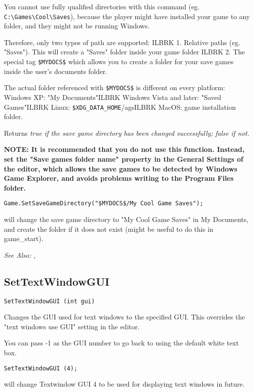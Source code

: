 You cannot use fully qualified directories with this command (eg. \verb$C:\Games\Cool\Saves$), because
the player might have installed your game to any folder, and they might not be running Windows.

Therefore, only two types of path are supported: ILBRK
1. Relative paths (eg. "Saves"). This will create a "Saves" folder inside your game folder ILBRK
2. The special tag \verb!$MYDOCS$! which allows you to create a folder for your save games
inside the user's documents folder.

The actual folder referenced with \verb!$MYDOCS$! is different on every platform:
Windows XP: "My Documents"ILBRK
Windows Vista and later: "Saved Games"ILBRK
Linux: \verb!$XDG_DATA_HOME!/agsILBRK
MacOS: game installation folder.

Returns \it{true} if the save game directory has been changed successfully; \it{false} if not.

\bf{NOTE:} It is recommended that you do not use this function. Instead, set the "Save games
folder name" property in the General Settings of the editor, which allows the save games to be
detected by Windows Game Explorer, and avoids problems writing to the Program Files folder.

\begin{verbatim}
Game.SetSaveGameDirectory("$MYDOCS$/My Cool Game Saves");
\end{verbatim}
will change the save game directory to "My Cool Game Saves" in My Documents, and create the
folder if it does not exist (might be useful to do this in game_start).

\it{See Also:} ,


\subsection{SetTextWindowGUI}\label{SetTextWindowGUI}%

\begin{verbatim}
SetTextWindowGUI (int gui)
\end{verbatim}
Changes the GUI used for text windows to the specified GUI. This overrides
the "text windows use GUI" setting in the editor.

You can pass -1 as the GUI number to go back to using the default white text box.

\begin{verbatim}
SetTextWindowGUI (4);
\end{verbatim}
will change Textwindow GUI 4 to be used for displaying text windows in future.


